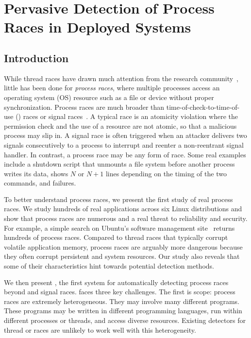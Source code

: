 \chapter{Pervasive Detection of Process Races in Deployed Systems}
\label{ch:racepro}

\section{Introduction} \label{racepro:sec:intro}

While thread races have drawn much attention from the research
community~\cite{cui:tern:osdi10,racerx:sosp03,racefuzzer:pldi08,wu:loom:osdi10,yu:racetrack:sosp},
little has been done for \emph{process races}, where multiple
processes access an operating system (OS) resource such as a file or
device without proper synchronization.  
Process races are much broader than time-of-check-to-time-of-use
(\toctou) races or signal races~\cite{signal-race}.  A typical \toctou
race is an atomicity violation where the permission check and the use
of a resource are not atomic, so that a malicious process may slip in.
A signal race is often triggered when an attacker delivers two signals
consecutively to a process to interrupt and reenter a non-reentrant
signal handler.  In contrast, a process race may be any form of race.
Some real examples include a shutdown script that unmounts a file system
before another process writes its data,  shows $N$
or $N+1$ lines depending on the timing of the two commands, and
 failures.

To better understand process races, we present the first study of real
process races.  We study hundreds of real applications across six
Linux distributions and show that process races are numerous and a real
threat to reliability and security.  For example, a simple search on
Ubuntu's software management site~\cite{launchpad} returns hundreds of 
process races.  Compared to thread races that typically corrupt volatile
application memory, process races are arguably more dangerous
because they often corrupt persistent and system resources.
Our study also reveals that some of their characteristics hint towards
potential detection methods.   

We then present \racepro, the first system for automatically detecting
process races beyond \toctou and signal races.  
\racepro faces three key challenges.  The first is scope:
process races are extremely heterogeneous.  They may involve many
different programs.  These programs may be written in different 
programming languages, run within different processes or threads,
and access diverse resources.  Existing detectors for thread or \toctou
races are unlikely to work well with this heterogeneity.

